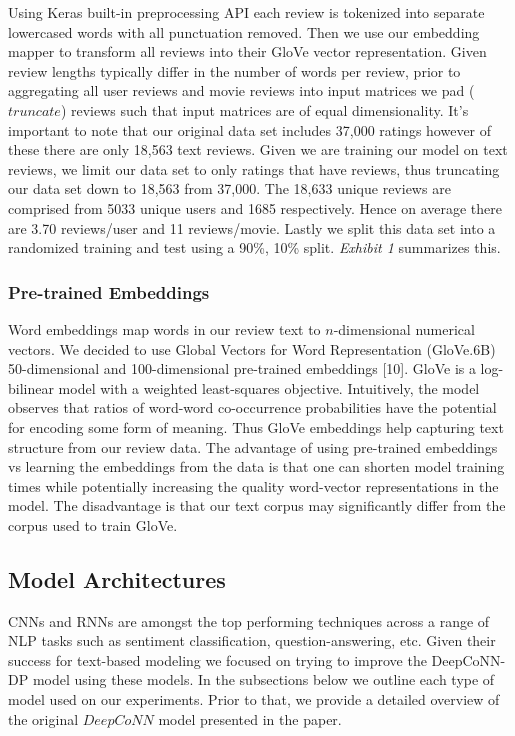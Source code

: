 \documentclass[10pt,twocolumn,letterpaper]{article}
\begin{document}
Using Keras built-in preprocessing API each review is tokenized into separate lowercased words with all punctuation removed. Then we use our embedding mapper to transform all reviews into their GloVe vector representation. Given review lengths typically differ in the number of words per review, prior to aggregating all user reviews and movie reviews into input matrices we pad ($truncate$) reviews such that input matrices are of equal dimensionality. It's important to note that our original data set includes 37,000 ratings however of these there are only 18,563 text reviews. Given we are training our model on text reviews, we limit our data set to only ratings that have reviews, thus truncating our data set down to 18,563 from 37,000. The 18,633 unique reviews are comprised from 5033 unique users and 1685 respectively. Hence on average there are 3.70 reviews/user and 11 reviews/movie. Lastly we split this data set into a randomized training and test using a 90\%, 10\% split. \textit{Exhibit 1} summarizes this.
 
\subsubsection{Pre-trained Embeddings}

Word embeddings map words in our review text to $n$-dimensional numerical vectors. We decided to use Global Vectors for Word Representation (GloVe.6B) 50-dimensional and 100-dimensional pre-trained embeddings [10]. GloVe is a log-bilinear model with a weighted least-squares objective. Intuitively, the model observes that ratios of word-word co-occurrence probabilities have the potential for encoding some form of meaning. Thus GloVe embeddings help capturing text structure from our review data. The advantage of using pre-trained embeddings vs learning the embeddings from the data is that one can shorten model training times while potentially increasing the quality word-vector representations in the model. The disadvantage is that our text corpus may significantly differ from the corpus used to train GloVe. 

\subsection{Model Architectures}
CNNs and RNNs are amongst the top performing techniques across a range of NLP tasks such as sentiment classification, question-answering, etc. Given their success for text-based modeling we focused on trying to improve the DeepCoNN-DP model using these models. In the subsections below we outline each type of model used on our experiments. Prior to that, we provide a detailed overview of the original $DeepCoNN$ model presented in the paper. 
\end{document}
